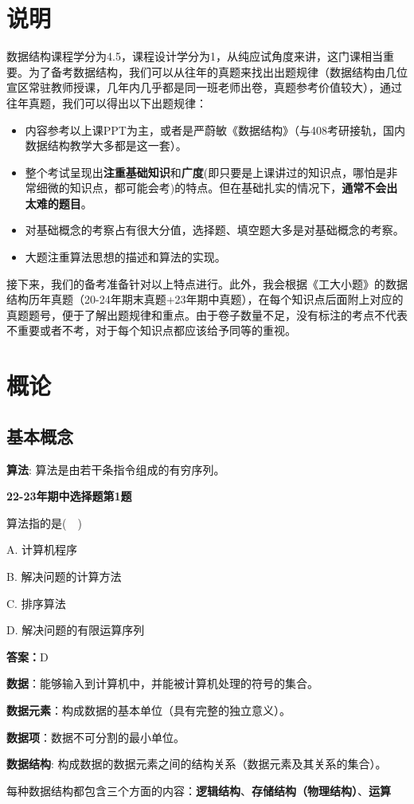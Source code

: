 \documentclass[a4paper]{ltxdoc}
\begin{document}
\section{说明}
\par 数据结构课程学分为4.5，课程设计学分为1，从纯应试角度来讲，这门课相当重要。为了备考数据结构，我们可以从往年的真题来找出出题规律（数据结构由几位宣区常驻教师授课，几年内几乎都是同一班老师出卷，真题参考价值较大），通过往年真题，我们可以得出以下出题规律：
\begin{itemize}
    \item 内容参考以上课PPT为主，或者是严蔚敏《数据结构》（与408考研接轨，国内数据结构教学大多都是这一套）。
    \item 整个考试呈现出\textbf{注重基础知识}和\textbf{广度}(即只要是上课讲过的知识点，哪怕是非常细微的知识点，都可能会考)的特点。但在基础扎实的情况下，\textbf{通常不会出太难的题目}。
    \item 对基础概念的考察占有很大分值，选择题、填空题大多是对基础概念的考察。
    \item 大题注重算法思想的描述和算法的实现。
\end{itemize}
\par 接下来，我们的备考准备针对以上特点进行。此外，我会根据《工大小题》的数据结构历年真题（20-24年期末真题+23年期中真题），在每个知识点后面附上对应的真题题号，便于了解出题规律和重点。由于卷子数量不足，没有标注的考点不代表不重要或者不考，对于每个知识点都应该给予同等的重视。
\section{概论}
\subsection{基本概念}
\par \textbf{算法}: 算法是由若干条指令组成的有穷序列。
\begin{framed}
    \textbf{22-23年期中选择题第1题}
    \par 算法指的是(\ \ )
    \par A. 计算机程序
    \par B. 解决问题的计算方法
    \par C. 排序算法
    \par D. 解决问题的有限运算序列
    \par \textbf{答案：}D
\end{framed}
\par \textbf{数据}：能够输入到计算机中，并能被计算机处理的符号的集合。
\par \textbf{数据元素}：构成数据的基本单位（具有完整的独立意义）。
\par \textbf{数据项}：数据不可分割的最小单位。
\par \textbf{数据结构}: 构成数据的数据元素之间的结构关系（数据元素及其关系的集合）。
\par 每种数据结构都包含三个方面的内容：\textbf{逻辑结构}、\textbf{存储结构（物理结构）}、\textbf{运算}
\end{document}

